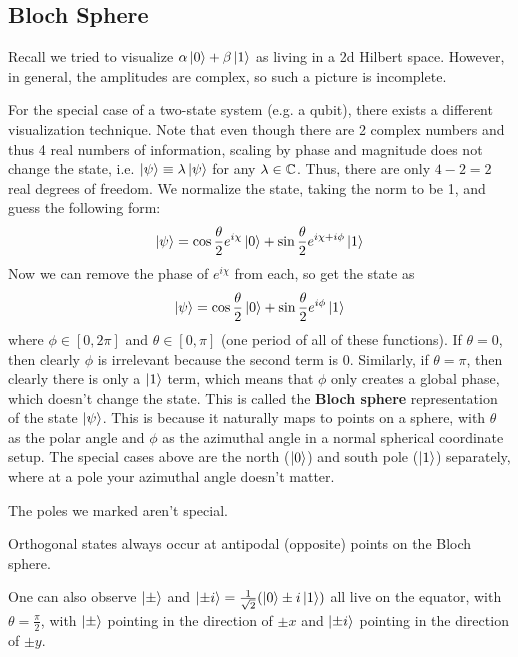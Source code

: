 \subsection{Bloch Sphere}
Recall we tried to visualize $\alpha\ket{0} + \beta\ket{1}$ as living in a 2d Hilbert space. However, in general, the amplitudes are
complex, so such a picture is incomplete.

For the special case of a two-state system (e.g. a qubit), there exists a different visualization technique. Note that even though there are 2 complex numbers and thus 4 real
numbers of information, scaling by phase and magnitude does not change the state, i.e. $\ket{\psi} \equiv \lambda \ket{\psi}$ for any $\lambda \in \operatorname{\mathbb{C}}$. Thus,
there are only $4 - 2 = 2$ real degrees of freedom. We normalize the state, taking the norm to be 1, and guess the following form:
\[ \ket{\psi} = \cos \frac{\theta}{2} e^{i \chi} \ket{0} + \sin \frac{\theta}{2} e^{i \chi + i \phi} \ket{1} \]
Now we can remove the phase of $e^{i \chi}$ from each, so get the state as 
\[ \ket{\psi} = \cos \frac{\theta}{2} \ket{0} + \sin \frac{\theta}{2} e^{i \phi} \ket{1} \]
where $\phi \in [0, 2\pi]$ and $\theta \in [0, \pi]$ (one period of all of these functions). If $\theta = 0$, then clearly $\phi$ is irrelevant because the second term is 0.
Similarly, if $\theta = \pi$, then clearly there is only a $\ket{1}$ term, which means that $\phi$ only creates a global phase, which doesn't change the state.
This is called the \textbf{Bloch sphere} representation of the state $\ket{\psi}$. This is because it naturally maps to points on a sphere,
with $\theta$ as the polar angle and $\phi$ as the azimuthal angle in a normal spherical coordinate setup. The special cases above are the north ($\ket{0}$) and south pole ($\ket{1}$) separately, where at a pole your azimuthal angle doesn't matter.

The poles we marked aren't special. 
\begin{note}
    Orthogonal states always occur at antipodal (opposite) points on the Bloch sphere.
\end{note}
One can also observe $\ket{\pm}$ and $\ket{\pm i} = \frac{1}{\sqrt{2}} \qty(\ket{0} \pm i \ket{1})$ all live on the equator, with $\theta = \frac{\pi}{2}$,
with $\ket{\pm}$ pointing in the direction of $\pm x$ and $\ket{\pm i}$ pointing in the direction of $\pm y$.


